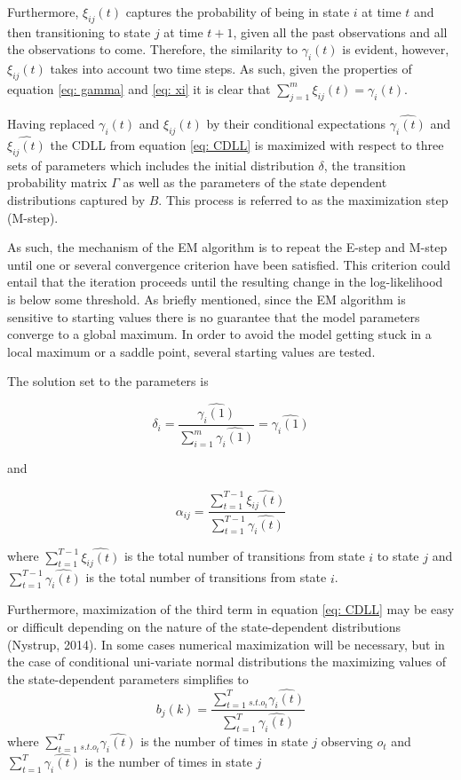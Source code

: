 Furthermore, $\xi_{ij}(t)$ captures the probability of being in state $i$ at time $t$ and then transitioning to state $j$ at time $t+1$, given all the past observations and all the observations to come. Therefore, the similarity to $\gamma_i(t)$ is evident, however, $\xi_{ij}(t)$ takes into account two time steps. As such, given the properties of equation \ref{eq: gamma} and \ref{eq: xi} it is clear that $\sum_{j=1}^m \xi_{ij}(t) = \gamma_i(t)$. 

Having replaced $\gamma_i(t)$ and $\xi_{ij}(t)$ by their conditional expectations $\hat{\gamma_i(t)}$ and $\hat{\xi_{ij}(t)}$ the CDLL from equation \ref{eq: CDLL} is maximized with respect to three sets of parameters which includes the initial distribution $\delta$, the transition probability matrix $\Gamma$ as well as the parameters of the state dependent distributions captured by $B$. This process is referred to as the maximization step (M-step). 

As such, the mechanism of the EM algorithm is to repeat the E-step and M-step until one or several convergence criterion have been satisfied. This criterion could entail that the iteration proceeds until the resulting change in the log-likelihood is below some threshold. As briefly mentioned, since the EM algorithm is sensitive to starting values there is no guarantee that the model parameters converge to a global maximum. In order to avoid the model getting stuck in a local maximum or a saddle point, several starting values are tested. 

The solution set to the parameters is 

\begin{equation}
    \delta_i = \frac{\hat{\gamma_i(1)}}{\sum_{i=1}^m\hat{\gamma_i(1)}} = \hat{\gamma_i(1)}
\end{equation}

and

\begin{equation}
    \alpha_{ij} = \frac{\sum_{t=1}^{T-1}\hat{\xi_{ij}(t)}}{\sum_{t=1}^{T-1}\hat{\gamma_i(t)}}
\end{equation}

where $\sum_{t=1}^{T-1}\hat{\xi_{ij}(t)}$ is the total number of transitions from state $i$ to state $j$ and $\sum_{t=1}^{T-1}\hat{\gamma_i(t)}$ is the total number of transitions from state $i$.

Furthermore, maximization of the third term in equation \ref{eq: CDLL} may be easy or difficult depending on the nature of the state-dependent distributions (Nystrup, 2014). In some cases numerical maximization will be necessary, but in the case of conditional uni-variate normal
distributions the maximizing values of the state-dependent parameters simplifies to
\begin{equation}
    b_j(k) = \frac{\sum_{t=1}^T_{s.t.o_{t}}\hat{\gamma_i(t)}}{\sum_{t=1}^T\hat{\gamma_i(t)}}    
\end{equation}
where $\sum_{t=1}^T_{s.t.o_t}\hat{\gamma_i(t)}$ is the number of times in state $j$ observing $o_t$ and $\sum_{t=1}^T\hat{\gamma_i(t)}$ is the number of times in state $j$

